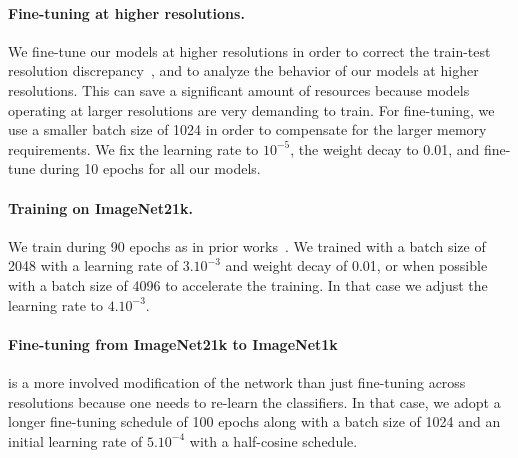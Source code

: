 \paragraph{Fine-tuning at higher resolutions.} We fine-tune our models at higher resolutions in order to correct the train-test resolution discrepancy~\cite{Touvron2019FixRes}, and to analyze the behavior of our models at higher resolutions. This can save a significant amount of resources because models operating at larger resolutions are very demanding to train. 
For fine-tuning, we use a smaller batch size of 1024 in order to compensate for the larger memory requirements. We fix the learning rate to $10^{-5}$, the weight decay to 0.01, and fine-tune during 10 epochs for all our models. 

\paragraph{Training on ImageNet21k.} We train during 90 epochs as in prior works~\cite{dosovitskiy2020image,liu2021swin}. We trained with a batch size of 2048 with a learning rate of $3.10^{-3}$ and weight decay of 0.01, or when possible with a batch size of 4096 to accelerate the training. In that case we adjust the learning rate to $4.10^{-3}$. 
%

\paragraph{Fine-tuning from ImageNet21k to ImageNet1k} is a more involved modification of the network than just fine-tuning across resolutions because one needs to re-learn the classifiers. In that case, we adopt a longer fine-tuning schedule of 100 epochs %
along with a batch size of 1024 and an initial learning rate of $5.10^{-4}$ with a half-cosine schedule. 

